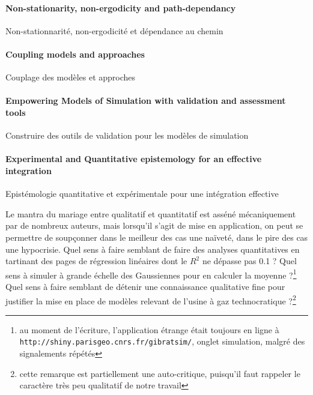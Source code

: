 


\paragraph{Non-stationarity, non-ergodicity and path-dependancy}{Non-stationnarité, non-ergodicité et dépendance au chemin}




\paragraph{Coupling models and approaches}{Couplage des modèles et approches}






\paragraph{Empowering Models of Simulation with validation and assessment tools}{Construire des outils de validation pour les modèles de simulation}






\paragraph{Experimental and Quantitative epistemology for an effective integration}{Epistémologie quantitative et expérimentale pour une intégration effective}

Le mantra du mariage entre qualitatif et quantitatif est asséné mécaniquement par de nombreux auteurs, mais lorsqu'il s'agit de mise en application, on peut se permettre de soupçonner dans le meilleur des cas une naïveté, dans le pire des cas une hypocrisie. Quel sens à faire semblant de faire des analyses quantitatives en tartinant des pages de régression linéaires dont le $R^2$ ne dépasse pas 0.1 ? %
 Quel sens à simuler à grande échelle des Gaussiennes pour en calculer la moyenne ?\footnote{au moment de l'écriture, l'application étrange était toujours en ligne à \texttt{http://shiny.parisgeo.cnrs.fr/gibratsim/}, onglet simulation, malgré des signalements répétés} Quel sens à faire semblant de détenir une connaissance qualitative fine pour justifier la mise en place de modèles relevant de l'usine à gaz technocratique ?\footnote{cette remarque est partiellement une auto-critique, puisqu'il faut rappeler le caractère très peu qualitatif de notre travail}

